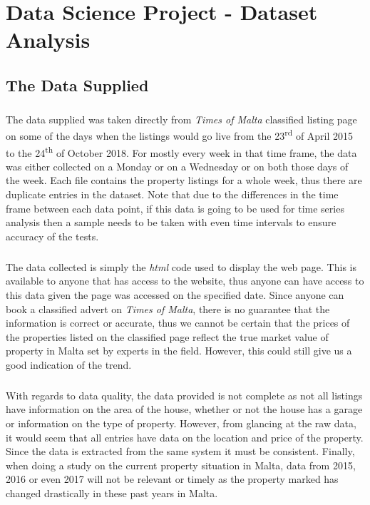 \chapter{Data Science Project - Dataset Analysis}

\section{The Data Supplied}
\paragraph{ }The data supplied was taken directly from \textit{Times of Malta} classified listing page on some of the days when the listings would go live from the 23\textsuperscript{rd} of April 2015 to the 24\textsuperscript{th} of October 2018. For mostly every week in that time frame, the data was either collected on a Monday or on a Wednesday or on both those days of the week. Each file contains the property listings for a whole week, thus there are duplicate entries in the dataset. Note that due to the differences in the time frame between each data point, if this data is going to be used for time series analysis then a sample needs to be taken with even time intervals to ensure accuracy of the tests.

\paragraph{ }The data collected is simply the \textit{html} code used to display the web page. This is available to anyone that has access to the website, thus anyone can have access to this data given the page was accessed on the specified date. Since anyone can book a classified advert on \textit{Times of Malta}, there is no guarantee that the information is correct or accurate, thus we cannot be certain that the prices of the properties listed on the classified page reflect the true market value of property in Malta set by experts in the field. However, this could still give us a good indication of the trend. 

\paragraph{ }With regards to data quality, the data provided is not complete as not all listings have information on the area of the house, whether or not the house has a garage or information on the type of property. However, from glancing at the raw data, it would seem that all entries have data on the location and price of the property. Since the data is extracted from the same system it must be consistent. Finally, when doing a study on the current property situation in Malta, data from 2015, 2016 or even 2017 will not be relevant or timely as the property marked has changed drastically in these past years in Malta. 


